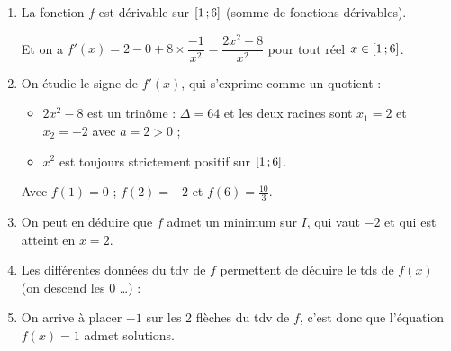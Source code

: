 \documentclass[a4paper,11pt]{article}
\begin{document}
\begin{enumerate}
	\item La fonction $f$ est dérivable sur $\mbox{\ensuremath{\left[1\mathpunct{};6\right]}}$ (somme de fonctions dérivables).
	
	Et on a $f'(x)=2-0+8 \times \dfrac{-1}{x^2}=\dfrac{2x^2-8}{x^2}$ pour tout réel $x \in \mbox{\ensuremath{\left[1\mathpunct{};6\right]}}$.
	\item On étudie le signe de $f'(x)$, qui s'exprime comme un quotient :
	\begin{itemize}
		\item $2x^2-8$ est un trinôme : $\Delta=64$ et les deux racines sont $x_1=2$ et $x_2=-2$ avec $a=2>0$ ;
		\item $x^2$ est toujours strictement positif sur $\mbox{\ensuremath{\left[1\mathpunct{};6\right]}}$.
	\end{itemize}
	\begin{center}
		
		Avec $f(1)=0$ ; $f(2)=-2$ et $f(6)=\tfrac{10}{3}$.
	\end{center}
	\item On peut en déduire que $f$ admet un minimum sur $I$, qui vaut $-2$ et qui est atteint en $x=2$.
	\item Les différentes données du tdv de $f$ permettent de déduire le tds de $f(x)$ (on \og descend les $0$ \fg\ldots) :
	\begin{center}
	\end{center}
	\item On arrive à \og placer \fg{} {\blue $-1$} sur les 2 flèches du tdv de $f$, c'est donc que l'équation $f(x)=1$ admet {} solutions.
	\begin{center}
	\end{center}
\end{enumerate} 
\end{document}
